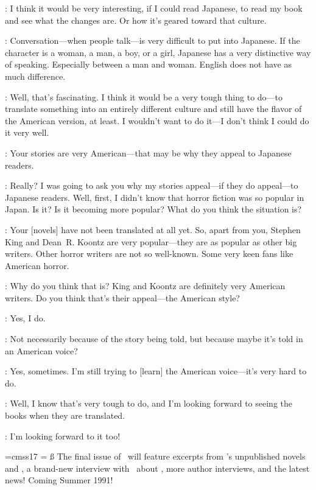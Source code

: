 \RM:  I think it would be very interesting, if I could read Japanese, to read my
book and see what the changes are. Or how it's geared toward that culture.

\KT:  Conversation---when people talk---is very difficult to put
into Japanese.  If the character is a woman, a man, a boy, or a girl, Japanese
has a very distinctive way of speaking.  Especially between a man and woman.
English does not have as much difference.

\RM:  Well, that's fascinating.  I think it would be a very tough thing to
do---to translate something into an entirely different culture and still have
the flavor of the American version, at least.  I wouldn't want to do it---I
don't think I could do it very well.

\KT:  Your stories are very American---that may be why they appeal to Japanese
readers.

\RM:  Really?  I was going to ask you why my stories appeal---if they do
appeal---to Japanese readers.  Well, first, I didn't know that horror fiction
was so popular in Japan.  Is it?  Is it becoming more popular?  What do you
think the situation is?

\KT:  Your [novels] have not been translated at all yet.  So, apart from you,
Stephen King and Dean~R. Koontz are very popular---they are as popular as
other big writers.  Other horror writers are not so well-known.  Some very keen
fans like American horror.

\RM:  Why do you think that is?  King and Koontz are definitely very American
writers.  Do you think that's their appeal---the American style?

\KT:  Yes, I do.

\RM:  Not necessarily because of the story being told, but because maybe it's
told in an American voice?

\KT:  Yes, sometimes.  I'm still trying to [learn] the American voice---it's
very hard to do.

\RM:  Well, I know that's very tough to do, and I'm looking forward to seeing
the books when they are translated.

\KT:  I'm looking forward to it too!\eoa

\endcolumns

\vfill

\begingroup
\font\HUGE=cmss17 %
=\vbox{\hsize=5in
	\twelvepoint\ss\noindent%
	The final issue of \LO\ will feature excerpts from \RRM's unpublished
	novels  and , a brand-new
	interview with \McC\ about , more author
	interviews, and the latest news!  Coming Summer 1991!
	\vfill%
	}

\centerline{}

\endgroup

